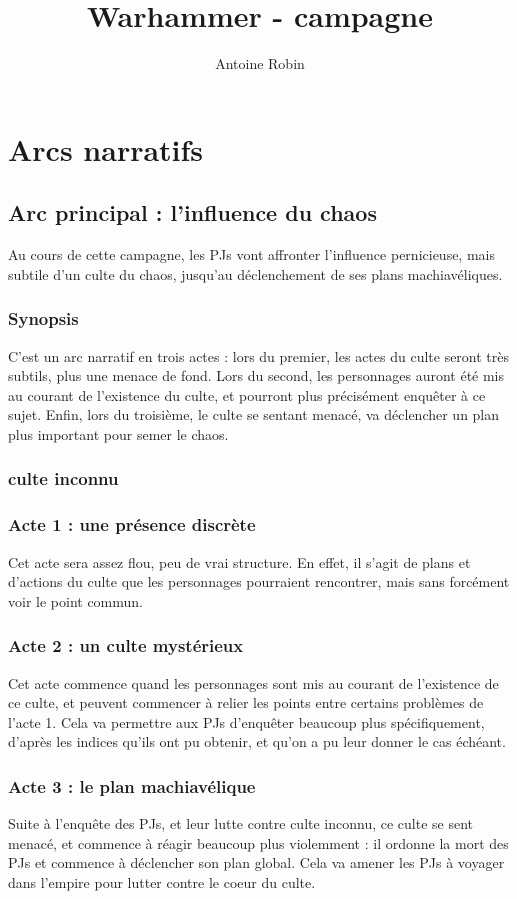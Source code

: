 \documentclass[10pt,a4paper]{book}
\author{ Antoine Robin}
\title{Warhammer - campagne}
\newcommand{\nomadversaire}{culte inconnu}
\begin{document}
\maketitle
\tableofcontents
\chapter{Arcs narratifs}
\section{Arc principal : l'influence du chaos}
Au cours de cette campagne, les PJs vont affronter l'influence pernicieuse, mais subtile d'un culte du chaos, jusqu'au déclenchement de ses plans machiavéliques.
\subsection{Synopsis}
 C'est un arc narratif en trois actes : lors du premier, les actes du culte seront très subtils, plus une menace de fond. Lors du second, les personnages auront été mis au courant de l'existence du culte, et pourront plus précisément enquêter à ce sujet. Enfin, lors du troisième, le culte se sentant menacé, va déclencher un plan plus important pour semer le chaos.
\subsection{\nomadversaire}
 
\subsection{Acte 1 : une présence discrète}
Cet acte sera assez flou, peu de vrai structure. En effet, il s'agit de plans et d'actions du culte que les personnages pourraient rencontrer, mais sans forcément voir le point commun.
\subsection{Acte 2 : un culte mystérieux}
Cet acte commence quand les personnages sont mis au courant de l'existence de ce culte, et peuvent commencer à relier les points entre certains problèmes de l'acte 1. Cela va permettre aux PJs d'enquêter beaucoup plus spécifiquement, d'après les indices qu'ils ont pu obtenir, et qu'on a pu leur donner le cas échéant.
\subsection{Acte 3 : le plan machiavélique}
Suite à l'enquête des PJs, et leur lutte contre \nomadversaire, ce culte se sent menacé, et commence à réagir beaucoup plus violemment : il ordonne la mort des PJs et commence à déclencher son plan global. Cela va amener les PJs à voyager dans l'empire pour lutter contre le coeur du culte.
\end{document}
